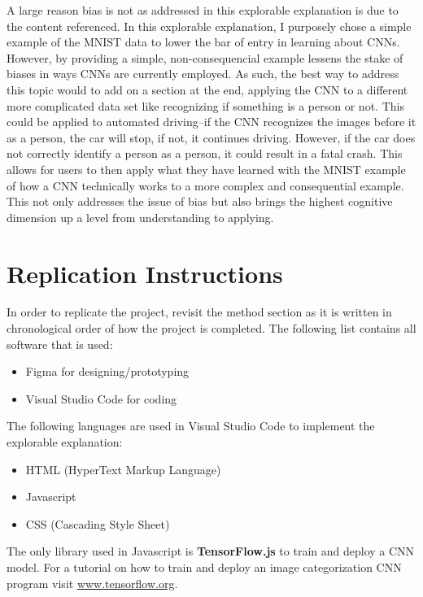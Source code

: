 \documentclass[10pt,twocolumn]{article}
\begin{document}
A large reason bias is not as addressed in this explorable explanation is due to the content referenced. In this explorable explanation, I purposely chose a simple example of the MNIST data to lower the bar of entry in learning about CNNs. However, by providing a simple, non-consequencial example lessens the stake of biases in ways CNNs are currently employed. As such, the best way to address this topic would to add on a section at the end, applying the CNN to a different more complicated data set like recognizing if something is a person or not. This could be applied to automated driving--if the CNN recognizes the images before it as a person, the car will stop, if not, it continues driving. However, if the car does not correctly identify a person as a person, it could result in a fatal crash. This allows for users to then apply what they have learned with the MNIST example of how a CNN technically works to a more complex and consequential example. This not only addresses the issue of bias but also brings the highest cognitive dimension up a level from understanding to applying. \cite{cognitiveDimension}

\appendix
\section{Replication Instructions}
In order to replicate the project, revisit the method section as it is written in chronological order of how the project is completed. The following list contains all software that is used: 
\begin{itemize}
    \item Figma for designing/prototyping
    \item Visual Studio Code for coding
\end{itemize}
The following languages are used in Visual Studio Code to implement the explorable explanation: 
\begin{itemize}
    \item HTML (HyperText Markup Language)
    \item Javascript
    \item CSS (Cascading Style Sheet)
\end{itemize}
The only library used in Javascript is \textbf{TensorFlow.js} to train and deploy a CNN model. 
For a tutorial on how to train and deploy an image categorization CNN program visit \href{https://www.tensorflow.org/js/tutorials/training/handwritten_digit_cnn}{www.tensorflow.org}.
\end{document}
